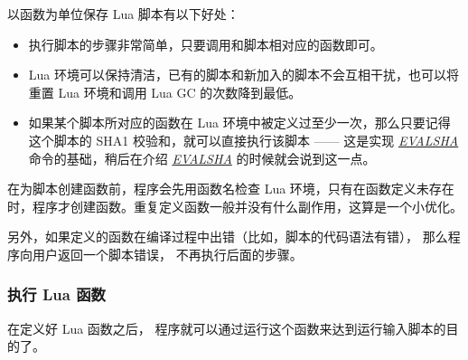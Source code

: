 \documentclass[a4paper,11pt,english]{sphinxmanual}
\begin{document}
以函数为单位保存 Lua 脚本有以下好处：
\begin{itemize}
\item {} 
执行脚本的步骤非常简单，只要调用和脚本相对应的函数即可。

\item {} 
Lua 环境可以保持清洁，已有的脚本和新加入的脚本不会互相干扰，也可以将重置 Lua 环境和调用 Lua GC 的次数降到最低。

\item {} 
如果某个脚本所对应的函数在 Lua 环境中被定义过至少一次，那么只要记得这个脚本的 SHA1 校验和，就可以直接执行该脚本 —— 这是实现 \href{http://redis.readthedocs.org/en/latest/script/evalsha.html\#evalsha}{\emph{EVALSHA}} 命令的基础，稍后在介绍 \href{http://redis.readthedocs.org/en/latest/script/evalsha.html\#evalsha}{\emph{EVALSHA}} 的时候就会说到这一点。

\end{itemize}

在为脚本创建函数前，程序会先用函数名检查 Lua 环境，只有在函数定义未存在时，程序才创建函数。重复定义函数一般并没有什么副作用，这算是一个小优化。

另外，如果定义的函数在编译过程中出错（比如，脚本的代码语法有错），
那么程序向用户返回一个脚本错误，
不再执行后面的步骤。


\subsubsection{执行 Lua 函数}
\label{feature/scripting:id7}
在定义好 Lua 函数之后，
程序就可以通过运行这个函数来达到运行输入脚本的目的了。
\end{document}
